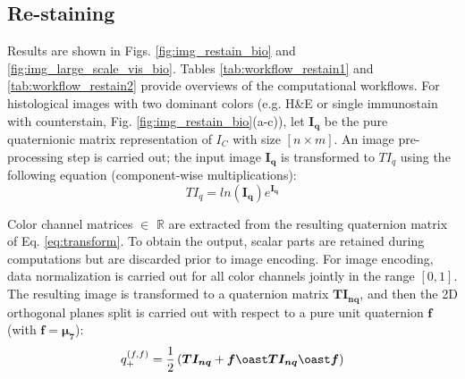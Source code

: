 \documentclass[superscriptaddress,longbibliography,aps,prl,twocolumn,10pt]{revtex4-2}
\begin{document}
\subsection*{\normalsize{Re-staining}}
Results are shown in Figs. \ref{fig:img_restain_bio} and \ref{fig:img_large_scale_vis_bio}. Tables \ref{tab:workflow_restain1} and \ref{tab:workflow_restain2} provide overviews of the computational workflows. For histological images with two dominant colors (e.g. H\&E or single immunostain with counterstain, Fig. \ref{fig:img_restain_bio}(a-c)), let $\boldsymbol{I_{q}}$ be the pure quaternionic matrix representation of $I_C$ with size $[n \times m]$. An image pre-processing step is carried out; the input image $\boldsymbol{I_{q}}$ is transformed to $TI_{q}$ using the following equation (component-wise multiplications):
    \begin{equation} \label{eq:transform}
        TI_{q} = ln(\boldsymbol{I_{q}}) e^{\boldsymbol{I_{q}}}
    \end{equation}

\noindent
Color channel matrices $\in$ $\mathbb{R}$ are extracted from the resulting quaternion matrix of Eq. \ref{eq:transform}. To obtain the output, scalar parts are retained during computations but are discarded prior to image encoding. For image encoding, data normalization is carried out for all color channels jointly in the range $[0,1]$. The resulting image is transformed to a quaternion matrix $\boldsymbol{TI_{nq}}$, and then the 2D orthogonal planes split is carried out with respect to a pure unit quaternion $\boldsymbol{f}$ (with $\boldsymbol{f} = \boldsymbol{\mu_{7}}$):
    \begin{equation} \label{eq:restaining1}
        q_{+}^{\left(f,f\right)} = \frac{1}{2} \left(\boldsymbol{TI_{nq}} + \boldsymbol{f} \oast \boldsymbol{TI_{nq}} \oast \boldsymbol{f} \right)
    \end{equation}
\end{document}
